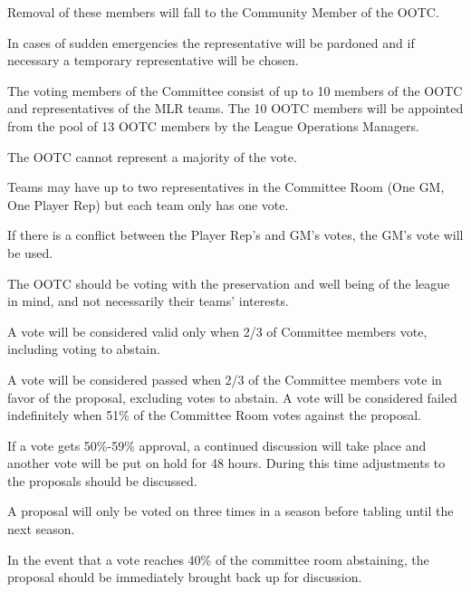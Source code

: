 \begin{deepEnumerate}
\begin{deepEnumerate}
\begin{deepEnumerate}
            \begin{deepEnumerate}
                \item Removal of these members will fall to the Community Member of the OOTC.
            \end{deepEnumerate}
            \item In cases of sudden emergencies the representative will be pardoned and if necessary a temporary representative will be chosen.
        \end{deepEnumerate}
    \end{deepEnumerate}
    \item The voting members of the Committee consist of up to 10 members of the OOTC and representatives of the MLR teams. The 10 OOTC members will be appointed 
    from the pool of 13 OOTC members by the League Operations Managers.
    \begin{deepEnumerate}
        \item The OOTC cannot represent a majority of the vote.
        \item Teams may have up to two representatives in the Committee Room (One GM, One Player Rep) but each team only has one vote.
        \begin{deepEnumerate}
            \item If there is a conflict between the Player Rep's and GM's votes, the GM's vote will be used.
        \end{deepEnumerate}
        \item The OOTC should be voting with the preservation and well being of the league in mind, and not necessarily their teams' interests.
        \item A vote will be considered valid only when 2/3 of Committee members vote, including voting to abstain. 
        \item A vote will be considered passed when 2/3 of the Committee members vote in favor of the proposal, excluding votes to abstain.
        A vote will be considered failed indefinitely when 51\% of the Committee Room votes against the proposal.
        \item If a vote gets 50\%-59\% approval, a continued discussion will take place and another vote will be put on hold for 48 hours.
        During this time adjustments to the proposals should be discussed.
        \item A proposal will only be voted on three times in a season before tabling until the next season.
        \item In the event that a vote reaches 40\% of the committee room abstaining, the proposal should be immediately brought back up for discussion.

\end{deepEnumerate}
\end{deepEnumerate}
